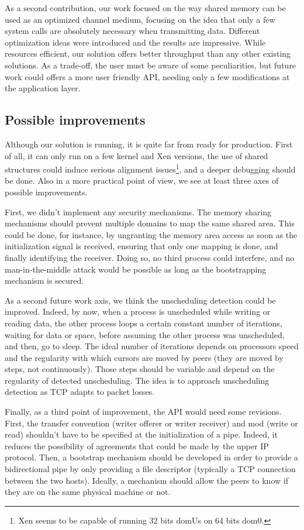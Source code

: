 \documentclass[journal]{IEEEtran}
\begin{document}
As a second contribution, our work focused on the way shared memory can be used as an optimized channel medium, focusing on the idea that only a few system calls are absolutely necessary when transmitting data. Different optimization ideas were introduced and the results are impressive. While resources efficient, our solution offers better throughput than any other existing solutions. As a trade-off, the user must be aware of some peculiarities, but future work could offers a more user friendly API, needing only a few modifications at the application layer.

\subsection{Possible improvements}

Although our solution is running, it is quite far from ready for production. First of all, it can only run on a few kernel and Xen versions, the use of shared structures could induce serious alignment issues\footnote{Xen seems to be capable of running 32 bits domUs on 64 bits dom0.}, and a deeper debugging should be done. Also in a more practical point of view, we see at least three axes of possible improvements.

First, we didn't implement any security mechanisms. The memory sharing mechanisms should prevent multiple domains to map the same shared area. This could be done, for instance, by ungranting the memory area access as soon as the initialization signal is received, ensuring that only one mapping is done, and finally identifying the receiver. Doing so, no third process could interfere, and no man-in-the-middle attack would be possible as long as the bootstrapping mechanism is secured.

As a second future work axis, we think the unscheduling detection could be improved. Indeed, by now, when a process is unscheduled while writing or reading data, the other process loops a certain constant number of iterations, waiting for data or space, before assuming the other process was unscheduled, and then, go to sleep. The ideal number of iterations depends on processors speed and the regularity with which cursors are moved by peers (they are moved by steps, not continuously). Those steps should be variable and depend on the regularity of detected unscheduling. The idea is to approach unscheduling detection as TCP adapts to packet losses.

Finally, as a third point of improvement, the API would need some revisions. First, the transfer convention (writer offerer or writer receiver) and mod (write or read) shouldn't have to be specified at the initialization of a pipe. Indeed, it reduces the possibility of agreements that could be made by the upper IP protocol. Then, a bootstrap mechanism should be developed in order to provide a bidirectional pipe by only providing a file descriptor (typically a TCP connection between the two hosts). Ideally, a mechanism should allow the peers to know if they are on the same physical machine or not.
\end{document}
